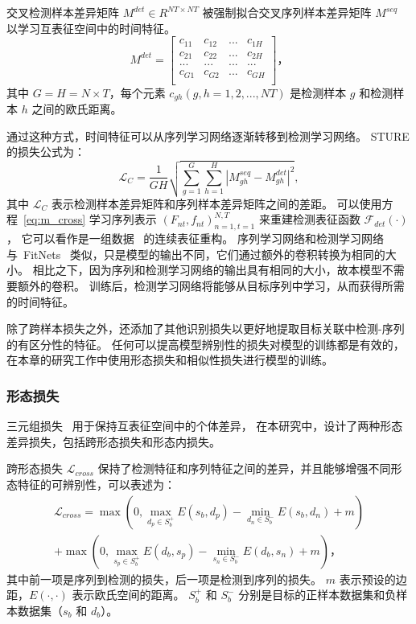 交叉检测样本差异矩阵 $M^{det}\in R^{NT\times NT}$ 被强制拟合交叉序列样本差异矩阵 $M^{seq}$ 以学习互表征空间中的时间特征。
\begin{equation}\label{eq:m_det}
M^{det}={
	\left[ \begin{array}{cccc}
	c_{11} & c_{12} & ... & c_{1H}\\
	c_{21} & c_{22} & ... & c_{2H}\\
	... & ... & ... & ... \\
	c_{G1} & c_{G2} & ... & c_{GH}\\
	\end{array} 
	\right ]}\mbox{，}
\end{equation}
其中 $G=H=N \times T$，每个元素 $c_{gh} (g,h=1,2,..., NT)$ 是检测样本 $g$ 和检测样本 $h$ 之间的欧氏距离。

通过这种方式，时间特征可以从序列学习网络逐渐转移到检测学习网络。
STURE 的损失公式为：
\begin{equation}\label{eq:m_cross}
\mathcal{L}_C=\frac{1}{G H} \sqrt{ \sum_{g=1}^{G} \sum_{h=1}^{H} | M_{gh}^{seq}-M_{gh}^{det} |^2 },
\end{equation}
其中 $\mathcal{L}_C$ 表示检测样本差异矩阵和序列样本差异矩阵之间的差距。
可以使用方程~\ref{eq:m_cross} 学习序列表示 ${(F_{nt},f_{nt})}_{n=1,t=1}^{N,T}$ 来重建检测表征函数 $\mathcal{F}_{det}(\cdot)$，
它可以看作是一组数据~\cite{RN987,RN988} 的连续表征重构。
序列学习网络和检测学习网络与~FitNets~\cite{romero2015fitnets} 类似，只是模型的输出不同，它们通过额外的卷积转换为相同的大小。
相比之下，因为序列和检测学习网络的输出具有相同的大小，故本模型不需要额外的卷积。
训练后，检测学习网络将能够从目标序列中学习，从而获得所需的时间特征。

除了跨样本损失之外，还添加了其他识别损失以更好地提取目标关联中检测-序列的有区分性的特征。
任何可以提高模型辨别性的损失对模型的训练都是有效的，
在本章的研究工作中使用形态损失和相似性损失进行模型的训练。


\subsubsection{形态损失}
三元组损失~\cite{cheng2016person} 用于保持互表征空间中的个体差异，
在本研究中，设计了两种形态差异损失，包括跨形态损失和形态内损失。

跨形态损失 $ \mathcal{L}_{cross} $ 保持了检测特征和序列特征之间的差异，并且能够增强不同形态特征的可辨别性，可以表述为：
\begin{equation}\label{eq:I2Sloss}
\begin{aligned}
\mathcal{L}_{cross} = \max (0, \max_{d_p\in S_b^+} E(s_b, d_p) - \min_{d_n\in S_b^-} E(s_b, d_n) + m) \\
+ \max(0, \max_{s_p\in S_b^+} E(d_b, s_p) - \min_{s_n\in S_b^-} E(d_b, s_n) + m )\mbox{，}
\end{aligned}
\end{equation}
其中前一项是序列到检测的损失，后一项是检测到序列的损失。
$m$ 表示预设的边距，$E(\cdot,\cdot)$ 表示欧氏空间的距离。
$S_b^+$ 和 $S_b^-$ 分别是目标的正样本数据集和负样本数据集（$s_b$ 和 $d_b$）。


